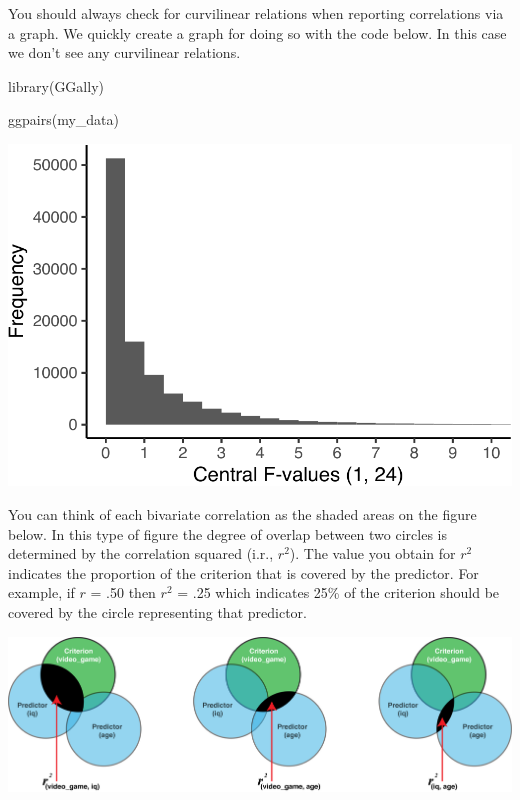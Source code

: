 \documentclass[
]{krantz}
\makeatletter
\newenvironment{Shaded}{\begin{snugshade}}{\end{snugshade}}
\newcommand{\FunctionTok}[1]{\textcolor[rgb]{0,0,0}{#1}}
\newcommand{\NormalTok}[1]{#1}
\newenvironment{kframe}{%
\medskip{}
\setlength{\fboxsep}{.8em}
 \def\at@end@of@kframe{}%
 \ifinner\ifhmode%
  \def\at@end@of@kframe{\end{minipage}}%
  \begin{minipage}{\columnwidth}%
 \fi\fi%
 \def\FrameCommand##1{\hskip\@totalleftmargin \hskip-\fboxsep
 \colorbox{shadecolor}{##1}\hskip-\fboxsep
     \hskip-\linewidth \hskip-\@totalleftmargin \hskip\columnwidth}%
 \MakeFramed {\advance\hsize-\width
   \@totalleftmargin\z@ \linewidth\hsize
   \@setminipage}}%
 {\par\unskip\endMakeFramed%
 \at@end@of@kframe}
\renewenvironment{Shaded}{\begin{kframe}}{\end{kframe}}
\makeatother
\begin{document}
You should always check for curvilinear relations when reporting correlations via a graph. We quickly create a graph for doing so with the code below. In this case we don't see any curvilinear relations.

\begin{Shaded}
\begin{Highlighting}[]
\FunctionTok{library}\NormalTok{(GGally)}

\FunctionTok{ggpairs}\NormalTok{(my\_data)}
\end{Highlighting}
\end{Shaded}

\includegraphics{bookdown_files/figure-latex/unnamed-chunk-452-1.pdf}

You can think of each bivariate correlation as the shaded areas on the figure below. In this type of figure the degree of overlap between two circles is determined by the correlation squared (i.r., \(r^2\)). The value you obtain for \(r^2\) indicates the proportion of the criterion that is covered by the predictor. For example, if \(r\) = .50 then \(r^2\) = .25 which indicates 25\% of the criterion should be covered by the circle representing that predictor.

\includegraphics[width=1\linewidth]{ch_multiple_regression/images/mr_venn_r}
\end{document}
